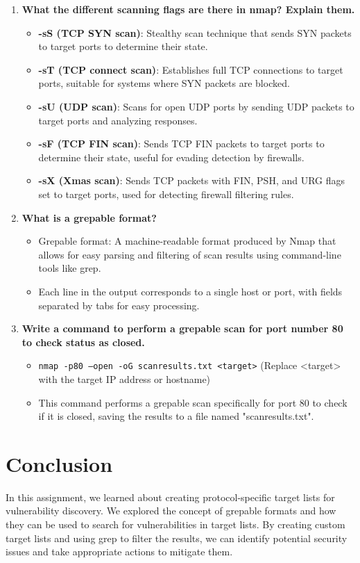 \documentclass[11pt]{article}
\begin{document}
\begin{enumerate}
    \item \textbf{What the different scanning flags are there in nmap? Explain them.}
          \begin{itemize}
              \item \textbf{-sS (TCP SYN scan)}: Stealthy scan technique that sends SYN packets to target ports to determine their state.
              \item \textbf{-sT (TCP connect scan)}: Establishes full TCP connections to target ports, suitable for systems where SYN packets are blocked.
              \item \textbf{-sU (UDP scan)}: Scans for open UDP ports by sending UDP packets to target ports and analyzing responses.
              \item \textbf{-sF (TCP FIN scan)}: Sends TCP FIN packets to target ports to determine their state, useful for evading detection by firewalls.
              \item \textbf{-sX (Xmas scan)}: Sends TCP packets with FIN, PSH, and URG flags set to target ports, used for detecting firewall filtering rules.
          \end{itemize}

    \item \textbf{What is a grepable format?}
          \begin{itemize}
              \item Grepable format: A machine-readable format produced by Nmap that allows for easy parsing and filtering of scan results using command-line tools like grep.
              \item Each line in the output corresponds to a single host or port, with fields separated by tabs for easy processing.
          \end{itemize}

    \item \textbf{Write a command to perform a grepable scan for port number 80 to check status as closed.}
          \begin{itemize}
              \item \texttt{nmap -p80 --open -oG scanresults.txt <target>} (Replace <target> with the target IP address or hostname)
              \item This command performs a grepable scan specifically for port 80 to check if it is closed, saving the results to a file named "scanresults.txt".
          \end{itemize}
\end{enumerate}


\section{Conclusion}
In this assignment, we learned about creating protocol-specific target lists for vulnerability discovery. We explored the concept of grepable formats and how they can be used to search for vulnerabilities in target lists. By creating custom target lists and using grep to filter the results, we can identify potential security issues and take appropriate actions to mitigate them.
\clearpage

\pagebreak
\end{document}
